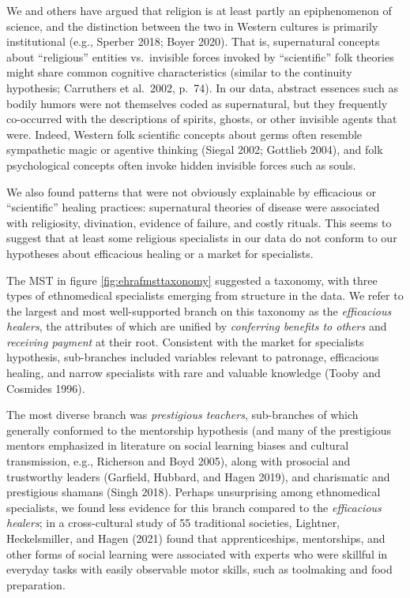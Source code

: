 \documentclass[
  11pt,
]{article}
\begin{document}
We and others have argued that religion is at least partly an epiphenomenon of science, and the distinction between the two in Western cultures is primarily institutional (e.g., Sperber 2018; Boyer 2020). That is, supernatural concepts about ``religious'' entities vs.~invisible forces invoked by ``scientific'' folk theories might share common cognitive characteristics (similar to the continuity hypothesis; Carruthers et al.~2002, p.~74). In our data, abstract essences such as bodily humors were not themselves coded as supernatural, but they frequently co-occurred with the descriptions of spirits, ghosts, or other invisible agents that were. Indeed, Western folk scientific concepts about germs often resemble sympathetic magic or agentive thinking (Siegal 2002; Gottlieb 2004), and folk psychological concepts often invoke hidden invisible forces such as souls.

We also found patterns that were not obviously explainable by efficacious or ``scientific'' healing practices: supernatural theories of disease were associated with religiosity, divination, evidence of failure, and costly rituals. This seems to suggest that at least some religious specialists in our data do not conform to our hypotheses about efficacious healing or a market for specialists.

The MST in figure \ref{fig:ehrafmsttaxonomy} suggested a taxonomy, with three types of ethnomedical specialists emerging from structure in the data. We refer to the largest and most well-supported branch on this taxonomy as the \emph{efficacious healers}, the attributes of which are unified by \emph{conferring benefits to others} and \emph{receiving payment} at their root. Consistent with the market for specialists hypothesis, sub-branches included variables relevant to patronage, efficacious healing, and narrow specialists with rare and valuable knowledge (Tooby and Cosmides 1996).

The most diverse branch was \emph{prestigious teachers}, sub-branches of which generally conformed to the mentorship hypothesis (and many of the prestigious mentors emphasized in literature on social learning biases and cultural transmission, e.g., Richerson and Boyd 2005), along with prosocial and trustworthy leaders (Garfield, Hubbard, and Hagen 2019), and charismatic and prestigious shamans (Singh 2018). Perhaps unsurprising among ethnomedical specialists, we found less evidence for this branch compared to the \emph{efficacious healers}; in a cross-cultural study of 55 traditional societies, Lightner, Heckelsmiller, and Hagen (2021) found that apprenticeships, mentorships, and other forms of social learning were associated with experts who were skillful in everyday tasks with easily observable motor skills, such as toolmaking and food preparation.
\end{document}
